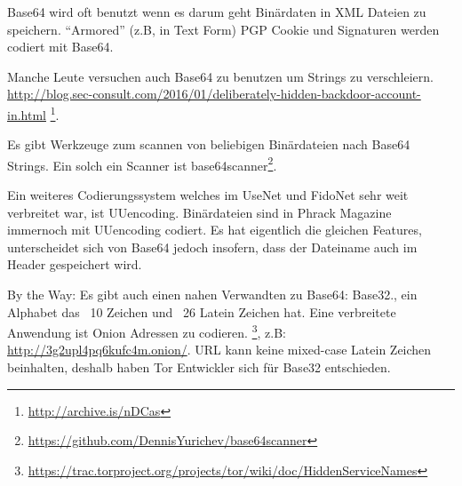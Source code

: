 Base64 wird oft benutzt wenn es darum geht Bin\"ardaten in  XML Dateien zu speichern.
``Armored'' (z.B, in Text Form) PGP Cookie und Signaturen werden codiert mit Base64.

Manche Leute versuchen auch Base64 zu benutzen um Strings zu verschleiern. 
\url{http://blog.sec-consult.com/2016/01/deliberately-hidden-backdoor-account-in.html}
\footnote{\url{http://archive.is/nDCas}}.

Es gibt Werkzeuge zum scannen von beliebigen Bin\"ardateien nach Base64 Strings.
Ein solch ein Scanner ist base64scanner\footnote{\url{https://github.com/DennisYurichev/base64scanner}}.

Ein weiteres Codierungssystem welches im UseNet und FidoNet sehr weit verbreitet
war, ist UUencoding. Binärdateien sind in Phrack Magazine immernoch mit UUencoding
codiert. Es hat eigentlich die gleichen Features, unterscheidet sich von Base64
jedoch insofern, dass der Dateiname auch im Header gespeichert wird.

By the Way: Es gibt auch einen nahen Verwandten zu Base64: Base32., ein Alphabet das ~10 Zeichen und ~26 Latein Zeichen hat. 
Eine verbreitete Anwendung ist Onion Adressen zu codieren. 
\footnote{\url{https://trac.torproject.org/projects/tor/wiki/doc/HiddenServiceNames}},
z.B: \\
\url{http://3g2upl4pq6kufc4m.onion/}.
\ac{URL} kann keine mixed-case Latein Zeichen beinhalten, deshalb haben Tor Entwickler sich f\"ur Base32 entschieden.
